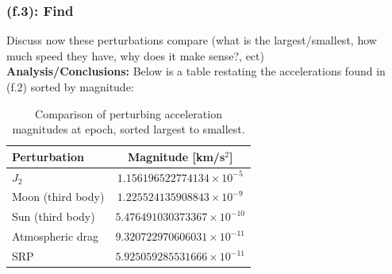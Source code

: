 \documentclass[titlepage]{article}
\begin{document}
\subsubsection*{(f.3): Find}
Discuss now these perturbations compare (what is the largest/smallest, how much speed they have, why does it make sense?, ect)\\

\textbf{Analysis/Conclusions:}
Below is a table restating the accelerations found in (f.2) sorted by magnitude:
\begin{table}[H]
	\centering
	\caption{Comparison of perturbing acceleration magnitudes at epoch, sorted largest to smallest.}
	\label{tab:f3_comparison}
	\begin{tabular}{|l|c|}
		\hline
		Perturbation & Magnitude [km/s$^2$] \\
		\hline
		$J_2$ & $1.156196522774134\times10^{-5}$ \\
		\hline
		Moon (third body) & $1.225524135908843\times10^{-9}$ \\
		\hline
		Sun (third body) & $5.476491030373367\times10^{-10}$ \\
		\hline
		Atmospheric drag & $9.320722970606031\times10^{-11}$ \\
		\hline
		SRP & $5.925059285531666\times10^{-11}$ \\
		\hline
	\end{tabular}
\end{table}
\end{document}
